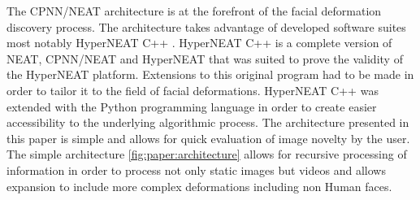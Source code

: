 The CPNN/NEAT architecture is at the forefront of the facial deformation discovery process. The architecture takes 
advantage of developed software suites most notably HyperNEAT C++ \cite{jasongauci}. HyperNEAT C++ is a complete
version of NEAT, CPNN/NEAT and HyperNEAT that was suited to prove the validity of the HyperNEAT platform. 
Extensions to this original program had to be made in order to tailor it to the field of facial deformations. 
HyperNEAT C++ was extended with the Python programming language in order to create easier accessibility to the
underlying algorithmic process. The architecture presented in this paper is simple and allows for quick 
evaluation of image novelty by the user. The simple architecture \ref{fig:paper:architecture} allows for recursive 
processing of information in order to process not only static images but videos and allows expansion to
include more complex deformations including non Human faces.


